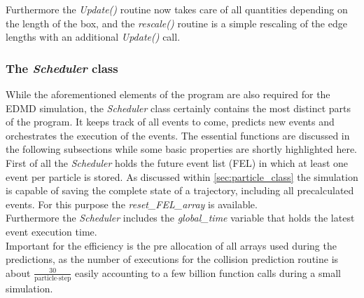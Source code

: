 Furthermore the \textit{Update()} routine now takes care of all quantities depending on the length of the box, and the \textit{rescale()} routine is a simple rescaling of the edge lengths with an additional \textit{Update()} call.\\

\subsubsection{The \textit{Scheduler} class}
\label{sec:scheduler_class}
While the aforementioned elements of the program are also required for the EDMD simulation, the \textit{Scheduler} class certainly contains the most distinct parts of the program. It keeps track of all events to come, predicts new events and orchestrates the execution of the events. The essential functions are discussed in the following subsections while some basic properties are shortly highlighted here.\\

First of all the \textit{Scheduler} holds the future event list (FEL) in which at least one event per particle is stored. As discussed within \autoref{sec:particle_class} the simulation is capable of saving the complete state of a trajectory, including all precalculated events. For this purpose the \textit{reset\_FEL\_array} is available.\\
Furthermore the \textit{Scheduler} includes the \textit{global\_time} variable that holds the latest event execution time.\\
Important for the efficiency is the pre allocation of all arrays used during the predictions, as the number of executions for the collision prediction routine is about $\frac{30}{\text{particle} \cdot \text{step}}$ easily accounting to a few billion function calls during a small simulation.\\

